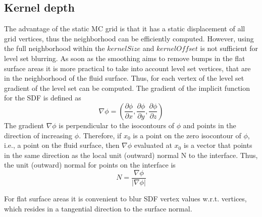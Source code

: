 \subsection{Kernel depth}
The advantage of the static MC grid is that it has a static displacement of all grid vertices, thus the neighborhood can be efficiently computed. However, using the full neighborhood within the $kernelSize$ and $kernelOffset$ is not sufficient for level set blurring. As soon as the smoothing aims to remove bumps in the flat surface areas it is more practical to take into account level set vertices, that are in the neighborhood of the fluid surface. Thus, for each vertex of the level set gradient of the level set can be computed.
The gradient of the implicit function for the SDF is defined as
\begin{equation}
	\nabla\phi = \left( \dfrac{\partial\phi}{\partial x}, \dfrac{\partial\phi}{\partial y}, \dfrac{\partial\phi}{\partial z}\right)
\end{equation}
The gradient $\nabla\phi$ is perpendicular to the isocontours of $\phi$ and points in the
direction of increasing $\phi$. Therefore, if $x_0$ is a point on the zero isocontour
of $\phi$, i.e., a point on the fluid surface, then $\nabla\phi$ evaluated at $x_0$ is a vector that points in the same direction as the local unit (outward) normal N to the interface. Thus, the unit (outward) normal for points on the interface is \cite{LevelSetMethods}
\begin{equation}
	N = \dfrac{\nabla\phi}{|\nabla \phi|}
\end{equation}

For flat surface areas it is convenient to blur SDF vertex values w.r.t. vertices, which resides in a tangential direction to the surface normal.


